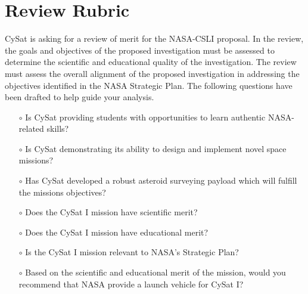 \documentclass[nocover]            %
{CSLI}                       %
\begin{document}
\section{Review Rubric}
CySat is asking for a review of merit for the NASA-CSLI proposal. In the review, the goals and objectives of the proposed investigation must be assessed to determine the scientific and educational quality of the investigation. The review must assess the overall alignment of the proposed investigation in addressing the objectives identified in the NASA Strategic Plan. The following questions have been drafted to help guide your analysis.\\
\begin{itemize}
\item[$\circ$]Is CySat providing students with opportunities to learn authentic NASA-related skills?\\
\item[$\circ$]Is CySat demonstrating its ability to design and implement novel space missions?\\
\item[$\circ$]Has CySat developed a robust asteroid surveying payload which will fulfill the missions objectives?\\
\item[$\circ$]Does the CySat I mission have scientific merit?\\
\item[$\circ$]Does the CySat I mission have educational merit?\\
\item[$\circ$]Is the CySat I mission relevant to NASA's Strategic Plan?\\
\item[$\circ$]Based on the scientific and educational merit of the mission, would you recommend that NASA provide a launch vehicle for CySat I?\\
\end{itemize}

\newpage
\appendix
{}



\end{document}
